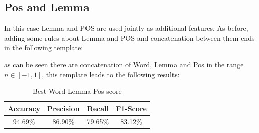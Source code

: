 \documentclass[11pt,a4paper]{article}
\begin{document}
\subsection{Pos and Lemma}
\label{PL}
In this case Lemma and POS are used jointly as additional features. As before, adding some rules about Lemma and POS and concatenation between them ends in the following template:
\begin{table}[H]
    \begin{center}
    \end{center}
    \caption{\label{t7} Best template for Word+Pos+Lemma}
\end{table}
as can be seen there are concatenation of Word, Lemma and Pos in the range $n \in [-1,1]$, this template leads to the following results:
\begin{table}[H]
    \begin{center}
        \begin{tabular}{|c|c|c|c|}
            \hline \bf Accuracy &   \bf Precision &  \bf Recall &  \bf F1-Score   \\ \hline
            94.69\% & 86.90\% & 79.65\% & 83.12\%\\
            \hline
        \end{tabular}
    \end{center}
    \caption{\label{t8} Best Word-Lemma-Pos score}
\end{table}
\end{document}
